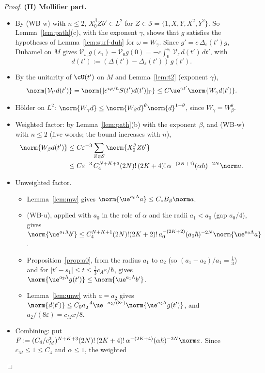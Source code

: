 \begin{proof}
\medskip\noindent\textbf{(II) Mollifier part.}
\begin{itemize}
\item By (WB-w) with $n\le2$, $X_0^\beta Zb'\in L^2$ for $Z\in\mathcal S=\{1,X,Y,X^2,Y^2\}$. So Lemma~\ref{lem:path}(c), with the exponent
$\gamma$, shows that $g$ satisfies the hypotheses of Lemma~\ref{lem:surf-duh} for $\omega=W_\gamma$. Since $g'=c\,\Delta_\varepsilon(t')g$,
Duhamel on $M$ gives $\mathcal V_{s_1}g(s_1)-\mathcal V_0g(0)=-c\int_0^{s_1}\mathcal V_{t'}d(t')\,dt'$, with
\[
d(t'):=(\Delta(t')-\Delta_\varepsilon(t'))\,g(t').
\]
\item By the unitarity of $\cU(t')$ on $M$ and Lemma~\ref{lem:t2} (exponent $\gamma$),
\[\norm{\mathcal V_{t'}d(t')}=\norm{[e^{i\varphi/\hbar}S(t')d(t')]_\Gamma}\le C\ue^{\gamma t'}\norm{W_\gamma d(t')}.\]
\item H\"older on $L^2$: $\norm{W_\gamma d}\le\norm{W_\beta d}^\theta\norm{d}^{1-\theta}$, since $W_\gamma=W_\beta^\theta$.
\item Weighted factor: by Lemma~\ref{lem:path}(b) with the exponent $\beta$, and (WB-w) with $n\le2$ (five words; the bound increases with $n$),
\begin{align*}
\norm{W_\beta d(t')}&\le C\varepsilon^{-3}\sum_{Z\in\mathcal S}\norm{X_0^\beta Zb'}\\
&\le C\varepsilon^{-3}\,C_4^{N+K+3}(2N)!\,(2K+4)!\,\alpha^{-(2K+4)}(\alpha\hbar)^{-2N}\norm a.
\end{align*}
\item Unweighted factor.
\begin{itemize}
\item Lemma~\ref{lem:mw} gives $\norm{\ue^{a_0\Lambda}a}\le C_*B_\beta\norm a$.
\item (WB-u), applied with $a_0$ in the role of $\alpha$ and the radii $a_1<a_0$ (gap $a_0/4$), gives
$\norm{\ue^{a_1\Lambda}b'}\le C_4^{N+K+1}(2N)!(2K+2)!\,a_0^{-(2K+2)}(a_0\hbar)^{-2N}\norm{\ue^{a_0\Lambda}a}$.
\item Proposition~\ref{prop:a0}, from the radius $a_1$ to $a_2$ (so $(a_1-a_2)/a_1=\tfrac13$) and for $|t'-s_1|\le t\le\tfrac13c_A\varepsilon/\hbar$, gives
$\norm{\ue^{a_2\Lambda}g(t')}\le\norm{\ue^{a_1\Lambda}b'}$.
\item Lemma~\ref{lem:unw} with $a=a_2$ gives $\norm{d(t')}\le C_0a_2^{-4}\ue^{-a_2/(8\varepsilon)}\norm{\ue^{a_2\Lambda}g(t')}$, and $a_2/(8\varepsilon)=c_Mx/8$.
\end{itemize}
\item Combining: put $F:=(C_4/c_M^2)^{N+K+3}(2N)!\,(2K+4)!\,\alpha^{-(2K+4)}(\alpha\hbar)^{-2N}\norm a$. Since $c_M\le1\le C_4$ and $\alpha\le1$, the weighted

\end{itemize}
\end{proof}
